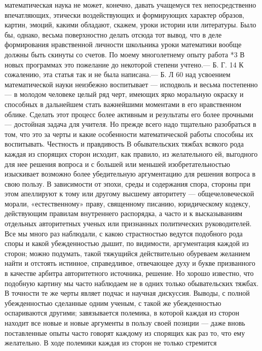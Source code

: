 \documentclass[12pt, a4paper, openany]{book}
\begin{document}
математическая наука не может, конечно, давать учащемуся тех  
непосредственно впечатляющих, этически воздействующих 
и формирующих характер образов, картин, эмоций,  
какими обладают, скажем, уроки истории или литературы. 
Было бы, однако, весьма поверхностно делать отсюда 
тот вывод, что в деле формирования нравственной личности 
школьника уроки математики вообще должны быть  
скинуты со счетов. По моему многолетнему опыту работа 
*3 В новых программах это пожелание до некоторой степени 
учтено.— Б. Г. 
14 К сожалению, эта статья так и не была написана.— Б. Л 
60 
над усвоением математической науки неизбежно  
воспитывает — исподволь и весьма постепенно — в молодом 
человеке целый ряд черт, имеющих ярко моральную  
окраску и способных в дальнейшем стать важнейшими  
моментами в его нравственном облике. Сделать этот процесс 
более активным и результаты его более прочными —  
достойная задача для учителя. Но прежде всего надо  
тщательно разобраться в том, что это за черты и какие  
особенности математической работы способны их воспитывать. 
Честность и правдивость 
В обывательских тяжбах всякого рода каждая из  
спорящих сторон исходит, как правило, из желательного ей, 
выгодного для нее решения вопроса и с большей или  
меньшей изобретательностью изыскивает возможно более  
убедительную аргументацию для решения вопроса в свою 
пользу. В зависимости от эпохи, среды и содержания  
спора, стороны при этом апеллируют к тому или другому 
высшему авторитету — общечеловеческой морали,  
«естественному» праву, священному писанию, юридическому 
кодексу, действующим правилам внутреннего распорядка, 
а часто и к высказываниям отдельных авторитетных  
ученых или признанных политических руководителей. Все 
мы много раз наблюдали, с какою страстностью ведутся 
подобного рода споры и какой убежденностью дышит, по 
видимости, аргументация каждой из сторон; можно  
подумать, такой тяжущийся действительно обуреваем  
желанием найти и отстоять истинное, справедливое,  
отвечающее духу и букве призванного в качестве арбитра  
авторитетного источника, решение. 
Но хорошо известно, что подобную картину мы часто 
наблюдаем не в одних только обывательских тяжбах. 
В точности те же черты являет подчас и научная дискуссия. 
Выводы, с полной убежденностью сделанные одним  
ученым, с такой же убежденностью оспариваются другими; 
завязывается полемика, в которой каждая из сторон  
находит все новые и новые аргументы в пользу своей  
позиции — даже вновь поставленные опыты часто говорят 
каждому из спорящих как раз то, что ему желательно. 
В ходе полемики каждая из сторон не только стремится 
\end{document}
